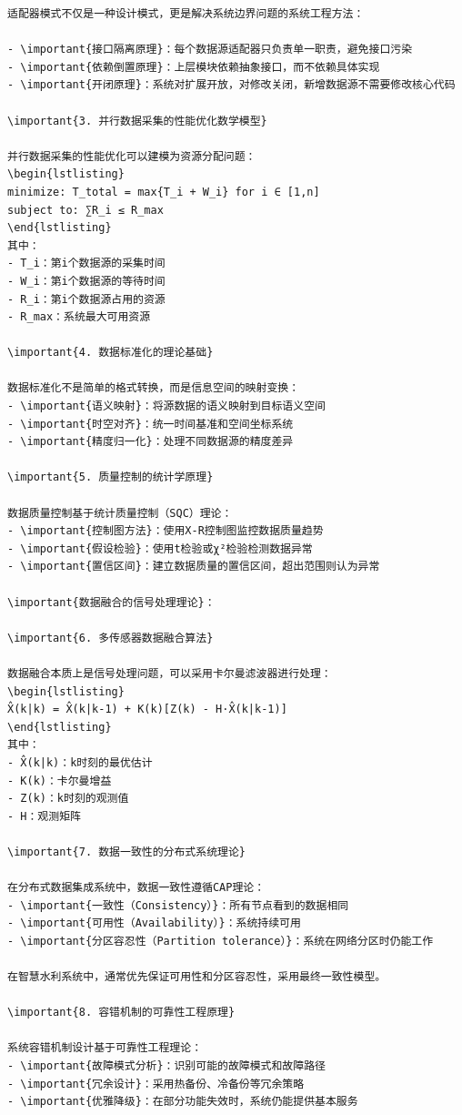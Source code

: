 \begin{verbatim}
适配器模式不仅是一种设计模式，更是解决系统边界问题的系统工程方法：

- \important{接口隔离原理}：每个数据源适配器只负责单一职责，避免接口污染
- \important{依赖倒置原理}：上层模块依赖抽象接口，而不依赖具体实现
- \important{开闭原理}：系统对扩展开放，对修改关闭，新增数据源不需要修改核心代码

\important{3. 并行数据采集的性能优化数学模型}

并行数据采集的性能优化可以建模为资源分配问题：
\begin{lstlisting}
minimize: T_total = max{T_i + W_i} for i ∈ [1,n]
subject to: ∑R_i ≤ R_max
\end{lstlisting}
其中：
- T_i：第i个数据源的采集时间
- W_i：第i个数据源的等待时间
- R_i：第i个数据源占用的资源
- R_max：系统最大可用资源

\important{4. 数据标准化的理论基础}

数据标准化不是简单的格式转换，而是信息空间的映射变换：
- \important{语义映射}：将源数据的语义映射到目标语义空间
- \important{时空对齐}：统一时间基准和空间坐标系统
- \important{精度归一化}：处理不同数据源的精度差异

\important{5. 质量控制的统计学原理}

数据质量控制基于统计质量控制（SQC）理论：
- \important{控制图方法}：使用X-R控制图监控数据质量趋势
- \important{假设检验}：使用t检验或χ²检验检测数据异常
- \important{置信区间}：建立数据质量的置信区间，超出范围则认为异常

\important{数据融合的信号处理理论}：

\important{6. 多传感器数据融合算法}

数据融合本质上是信号处理问题，可以采用卡尔曼滤波器进行处理：
\begin{lstlisting}
X̂(k|k) = X̂(k|k-1) + K(k)[Z(k) - H·X̂(k|k-1)]
\end{lstlisting}
其中：
- X̂(k|k)：k时刻的最优估计
- K(k)：卡尔曼增益
- Z(k)：k时刻的观测值
- H：观测矩阵

\important{7. 数据一致性的分布式系统理论}

在分布式数据集成系统中，数据一致性遵循CAP理论：
- \important{一致性（Consistency）}：所有节点看到的数据相同
- \important{可用性（Availability）}：系统持续可用
- \important{分区容忍性（Partition tolerance）}：系统在网络分区时仍能工作

在智慧水利系统中，通常优先保证可用性和分区容忍性，采用最终一致性模型。

\important{8. 容错机制的可靠性工程原理}

系统容错机制设计基于可靠性工程理论：
- \important{故障模式分析}：识别可能的故障模式和故障路径
- \important{冗余设计}：采用热备份、冷备份等冗余策略
- \important{优雅降级}：在部分功能失效时，系统仍能提供基本服务


\end{verbatim}
